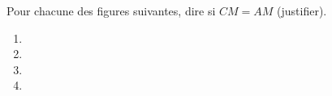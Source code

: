 
\begin{exercice}\label{exo2smath-0221}

    Pour chacune des figures suivantes, dire si \( CM=AM\) (justifier).
            
    \begin{enumerate}
        \item
    
\item
       
   \item
      
  \item
     
    \end{enumerate}

\end{exercice}
